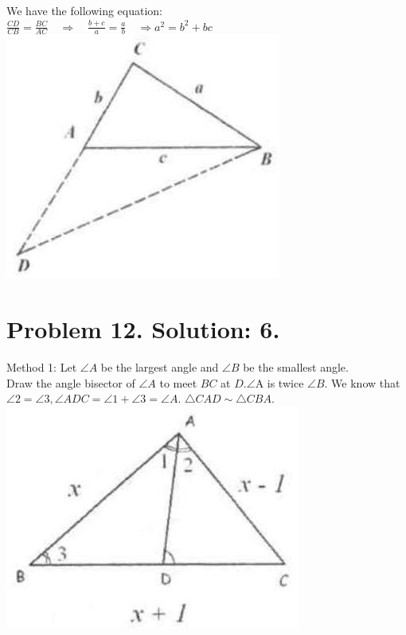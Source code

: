 \documentclass[10pt]{article}
\begin{document}
We have the following equation:\\
\(\frac{C D}{C B}=\frac{B C}{A C} \quad \Rightarrow \quad \frac{b+c}{a}=\frac{a}{b} \quad \Rightarrow a^{2}=b^{2}+b c\)\\
\includegraphics[max width=\textwidth, center]{2025_04_17_97bc1f7e44d93c271a88g-072}

\section*{Problem 12. Solution: 6.}
Method 1: Let \(\angle A\) be the largest angle and \(\angle B\) be the smallest angle.\\
Draw the angle bisector of \(\angle A\) to meet \(B C\) at \(D . \angle \mathrm{A}\) is twice \(\angle B\). We know that \(\angle 2=\angle 3, \angle A D C=\angle 1+\angle 3=\angle A\). \(\triangle C A D \sim \triangle C B A\).\\
\includegraphics[max width=\textwidth, center]{2025_04_17_97bc1f7e44d93c271a88g-072(1)}
\end{document}
